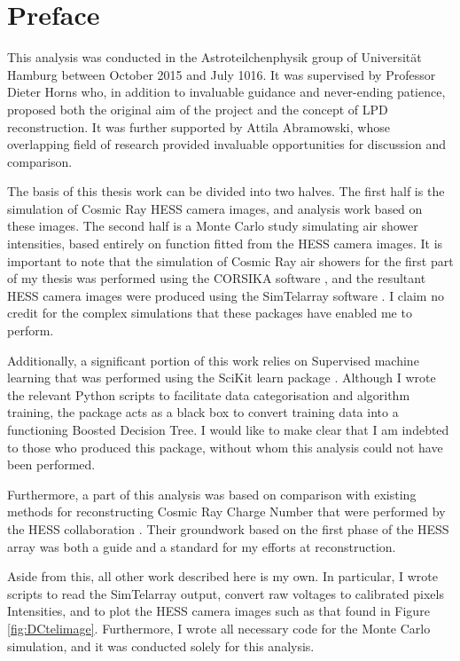 \documentclass[11pt]{article}
\begin{document}
\section{Preface}
This analysis was conducted in the Astroteilchenphysik group of Universit\"{a}t Hamburg between October 2015 and July 1016. It was supervised by Professor Dieter Horns who, in addition to invaluable guidance and never-ending patience, proposed both the original aim of the project and the concept of LPD reconstruction. It was further supported by Attila Abramowski, whose overlapping field of research provided invaluable opportunities for discussion and comparison. 

The basis of this thesis work can be divided into two halves. The first half is the simulation of Cosmic Ray HESS camera images, and analysis work based on these images. The second half is a Monte Carlo study simulating air shower intensities, based entirely on function fitted from the HESS camera images. It is important to note that the simulation of Cosmic Ray air showers for the first part of my thesis was performed using the CORSIKA software \cite{Heck98}, and the resultant HESS camera images were produced using the Sim\textunderscore Telarray software \cite{Bernlohr08}. I claim no credit for the complex simulations that these packages have enabled me to perform. 

Additionally, a significant portion of this work relies on Supervised machine learning that was performed using the SciKit learn package \cite{scikit-learn}. Although I wrote the relevant Python scripts to facilitate data categorisation and algorithm training, the package acts as a black box to convert training data into a functioning Boosted Decision Tree. I would like to make clear that I am indebted to those who produced this package, without whom this analysis could not have been performed.

Furthermore, a part of this analysis was based on comparison with existing methods for reconstructing Cosmic Ray Charge Number that were performed by the HESS collaboration \cite{hess07}. Their groundwork based on the first phase of the HESS array was both a guide and a standard for my efforts at reconstruction.

Aside from this, all other work described here is my own. In particular, I wrote scripts to read the Sim\textunderscore Telarray output, convert raw voltages to calibrated pixels Intensities, and to plot the HESS camera images such as that found in Figure \ref{fig:DCtelimage}. Furthermore, I wrote all necessary code for the Monte Carlo simulation, and it was conducted solely for this analysis. 
\newpage
\end{document}
